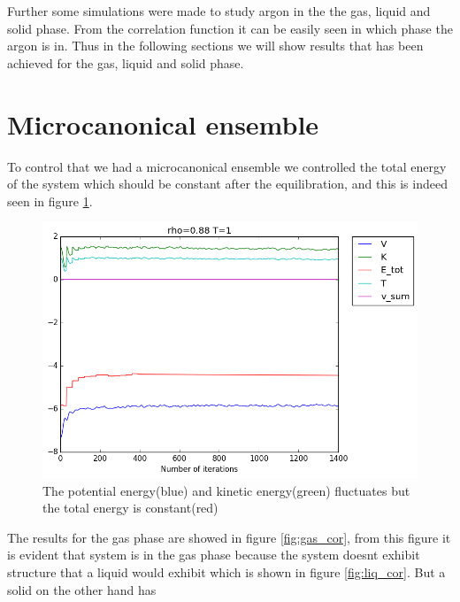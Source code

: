 \documentclass[12pt,a4paper]{report}
\begin{document}
Further some simulations were made to study argon in the the gas, liquid and solid phase. From the correlation function it can be easily seen in which phase the argon is  in. Thus in the following sections we will show results that has been achieved for the gas, liquid and solid phase.

\section{Microcanonical ensemble}

To control that we had a microcanonical ensemble we controlled the total energy of the system which should be constant after the equilibration, and this is indeed seen in figure \ref{fig:all_rho}.

\begin{figure}[H]
\centering
\includegraphics[scale=0.5]{All_rho088_T1_rm35_2.png}
\caption{The potential energy(blue) and kinetic energy(green) fluctuates but the total energy is constant(red) }
\label{fig:all_rho}
\end{figure}

The results for the gas phase are showed in figure \ref{fig:gas_cor}, from this figure it is evident that system is in the gas phase because the system doesnt exhibit structure that a liquid would exhibit which is shown in figure \ref{fig:liq_cor}. But a solid on the other hand has
\end{document}
